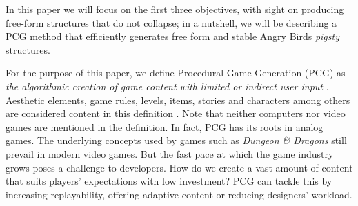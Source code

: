 \documentclass[runningheads,a4paper]{llncs}
\begin{document}
In this paper we will focus on the first three objectives, with sight
on producing free-form structures that do not collapse; in a nutshell,
we will be describing a PCG method that efficiently generates free
form and stable Angry Birds {\em pigsty} structures.




For the purpose of this paper, we define Procedural Game Generation
(PCG) as \textit{the algorithmic creation of game content with
  limited or indirect user input} \cite{togelius2011procedural}. 
Aesthetic elements, game rules, levels, items, stories and characters
among others are considered content in this definition  
\cite{togelius2011procedural}. %
Note that neither computers nor video games are mentioned in the
definition. In fact, PCG has its roots in analog games.
The underlying concepts used by games such as \textit{Dungeon \& Dragons} still 
prevail in modern video games. \cite{smith2015analog} 
%
But the fast pace at which the game industry grows poses a challenge to developers. 
How do we create a vast amount of content that suits 
players' expectations with low investment? PCG can tackle this by  
increasing replayability, offering adaptive content or reducing designers' 
workload.\cite{togelius2016introduction}
\end{document}
